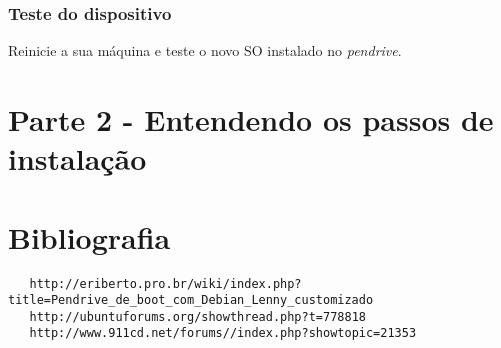 \documentclass[a4paper,10pt]{article}
\begin{document}
    \subsubsection{Teste do dispositivo}
      Reinicie a sua máquina e teste o novo SO instalado no \emph{pendrive}.

\newpage
\section{Parte 2 - Entendendo os passos de instalação}

\newpage
\section{Bibliografia}

  \begin{lstlisting}
   http://eriberto.pro.br/wiki/index.php?title=Pendrive_de_boot_com_Debian_Lenny_customizado
   http://ubuntuforums.org/showthread.php?t=778818 
   http://www.911cd.net/forums//index.php?showtopic=21353
  \end{lstlisting}
\end{document}
